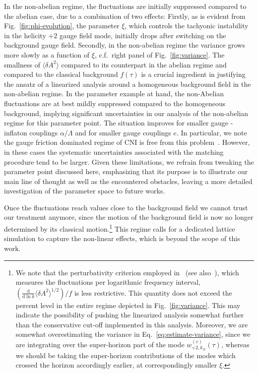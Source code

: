 In the non-abelian regime, the fluctuations are initially suppressed compared to the abelian case, due to a combination of two effects: { Firstly, as is evident from Fig.~\ref{fig:phi-evolution}, the parameter $\xi$, which controls the tachyonic instability in the helicity $+2$ gauge field mode, initially drops after switching on the background gauge field. Secondly, in the non-abelian regime the variance grows more slowly as a function of $\xi$, c.f.\ right panel of Fig.~\ref{fig:variance}.} The smallness of $\langle \delta A^2 \rangle$ compared to its counterpart in the abelian regime and compared to the classical background $f(\tau)$ is a crucial ingredient in justifying the ansatz of a linearized analysis around a homogeneous background field in the non-abelian regime. In the parameter example at hand, the non-Abelian fluctuations are at best mildly suppressed compared to the homogeneous background, implying significant uncertainties in our analysis of the non-abelian regime for this parameter point. The situation improves for smaller gauge - inflaton couplings $\alpha/\Lambda$ and for smaller gauge couplings $e$. In particular, we note the gauge friction dominated regime of CNI is free from this problem~\cite{Adshead:2016omu}. However, in these cases the systematic uncertainties associated with the matching procedure tend to be larger. Given these limitations, we refrain from tweaking the parameter point discussed here, emphasizing that its purpose is to illustrate our main line of thought as well as the encountered obstacles, leaving a more detailed investigation of the parameter space to future works. 

Once the fluctuations reach values close to the background field we cannot trust our treatment anymore, since the motion of the background field is now no longer determined by its classical motion.\footnote{We note that the perturbativity criterion employed in~\cite{Caldwell:2017chz} (see also~\cite{Adshead:2016omu,Adshead:2017hnc}), which measures the fluctuations per logarithmic frequency interval, $(\tfrac{\textrm{d} }{\textrm{d} \ln k} \langle \delta A^2 \rangle^{1/2})/f$ is less restrictive. This quantity does not exceed the percent level in the entire regime depicted in Fig.~\ref{fig:variance}. This may indicate the possibility of pushing the linearized analysis somewhat further than  the conservative cut-off implemented in this analysis. Moreover, we are somewhat overestimating the variance in Eq.~\eqref{eq:estimate-variance}, since we are integrating over the super-horizon part of the mode $ w_{+2, k_N}^{(e)}(\tau)$, whereas we should be taking the super-horizon contributions of the modes which crossed the horizon accordingly earlier, at correspondingly smaller $\xi$. } 
This regime calls for a dedicated lattice simulation to capture the non-linear effects, which is beyond the scope of this work.


